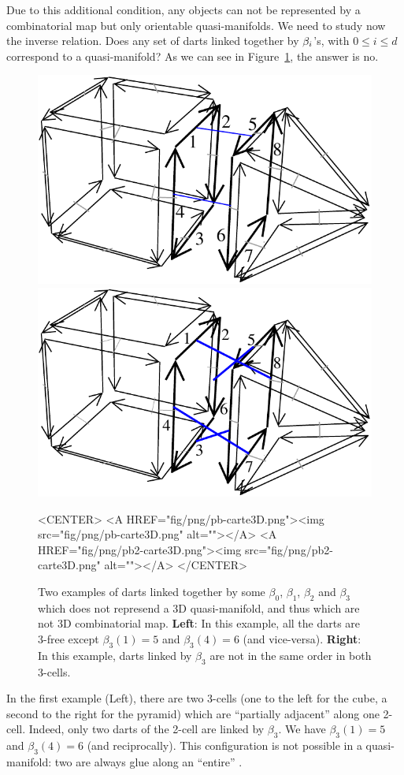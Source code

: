 Due to this additional condition, any objects can not be represented
by a combinatorial map but only orientable quasi-manifolds. We need to
study now the inverse relation. Does any set of darts linked together by
$\beta_{i}$'s, with $0 \leq i \leq d$ correspond to a quasi-manifold?  As
we can see in Figure~\ref{fig-pb-carte}, the answer is no.
%
\begin{figure}[ht]
  \begin{ccTexOnly}
    \begin{center}
      \includegraphics[width=.4\textwidth]
      {Combinatorial_map/fig/pdf/pb-carte3D}
      \qquad
      \includegraphics[width=.4\textwidth]
      {Combinatorial_map/fig/pdf/pb2-carte3D}
    \end{center}
  \end{ccTexOnly}
  \begin{ccHtmlOnly}
    <CENTER>
    <A HREF="fig/png/pb-carte3D.png"><img src="fig/png/pb-carte3D.png" alt=""></A>
    <A HREF="fig/png/pb2-carte3D.png"><img src="fig/png/pb2-carte3D.png" alt=""></A>
    </CENTER>
    \end{ccHtmlOnly}
    \caption{Two examples of darts linked together by some $\beta_0$,
      $\beta_1$, $\beta_2$ and $\beta_3$ which does not represend a 3D
      quasi-manifold, and thus which are not 3D combinatorial map. 
      \textbf{Left}: In this example, all the darts are 3-free except
      $\beta_3(1)=5$ and $\beta_3(4)=6$ (and vice-versa).
      \textbf{Right}: In this example, darts linked by $\beta_3$ 
      are not in the same order in both 3-cells.
    }
    \label{fig-pb-carte}
\end{figure}

In the first example (Left), there are two 3-cells (one to the left
for the cube, a second to the right for the pyramid) which are
``partially adjacent'' along one 2-cell. Indeed, only two darts
of the 2-cell are linked by $\beta_3$. We have $\beta_3(1)=5$ and
$\beta_3(4)=6$ (and reciprocally).  This configuration is not possible
in a quasi-manifold: two  are always glue along an ``entire''
.

